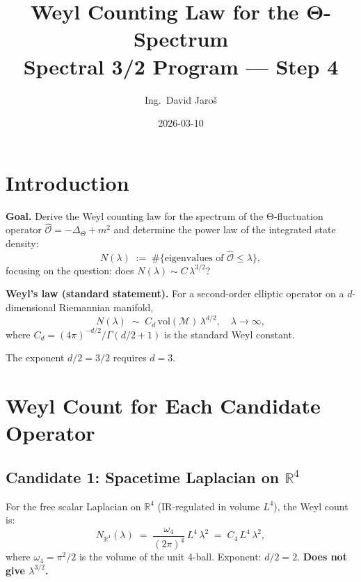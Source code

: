 \documentclass[11pt,a4paper]{article}
\title{Weyl Counting Law for the Θ-Spectrum\\
    \large Spectral 3/2 Program — Step 4}
\author{Ing.\ David Jaroš}
\date{2026-03-10}
\theoremstyle{definition}
\theoremstyle{remark}
\begin{document}
  \maketitle
\fi

\section{Introduction}
\label{sec:intro}

\textbf{Goal.}
Derive the Weyl counting law for the spectrum of the Θ-fluctuation operator
$\hat{\mathcal{O}} = -\Delta_\Theta + m^2$ and determine the power law of
the integrated state density:
\begin{equation}
  N(\lambda) \;:=\; \#\bigl\{\text{eigenvalues of }\hat{\mathcal{O}} \leq \lambda\bigr\},
  \label{eq:N_lambda_def}
\end{equation}
focusing on the question: does $N(\lambda) \sim C\,\lambda^{3/2}$?

\textbf{Weyl's law (standard statement).}
For a second-order elliptic operator on a $d$-dimensional Riemannian manifold,
\begin{equation}
  N(\lambda) \;\sim\; C_d\,\mathrm{vol}(\mathcal{M})\,\lambda^{d/2},
  \quad \lambda \to \infty,
  \label{eq:Weyl_std}
\end{equation}
where $C_d = (4\pi)^{-d/2} / \Gamma(d/2 + 1)$ is the standard Weyl constant.

The exponent $d/2 = 3/2$ requires $d = 3$.

\section{Weyl Count for Each Candidate Operator}
\label{sec:weyl_each}

\subsection{Candidate 1: Spacetime Laplacian on $\mathbb{R}^4$}

For the free scalar Laplacian on $\mathbb{R}^4$ (IR-regulated in volume $L^4$),
the Weyl count is:
\begin{equation}
  N_{\mathbb{R}^4}(\lambda) \;=\; \frac{\omega_4}{(2\pi)^4}\,L^4\,\lambda^{2}
  \;=\; C_4\,L^4\,\lambda^{2},
  \label{eq:N_R4}
\end{equation}
where $\omega_4 = \pi^2/2$ is the volume of the unit 4-ball.
Exponent: $d/2 = 2$.
\textbf{Does not give $\lambda^{3/2}$.}
\end{document}
